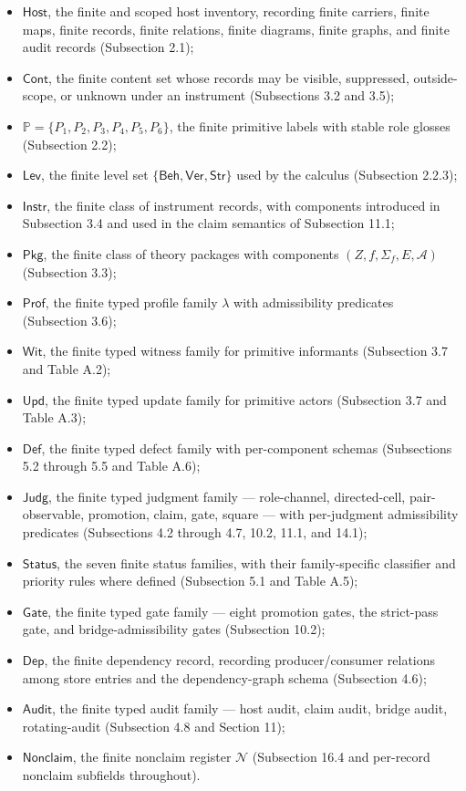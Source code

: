 \documentclass[11pt]{article}
\providecommand{\tightlist}{}
\theoremstyle{definition}
\begin{document}
\begin{itemize}
\tightlist
\item
  \(\mathsf{Host}\), the finite and scoped host inventory, recording finite carriers, finite maps, finite records, finite relations, finite diagrams, finite graphs, and finite audit records (Subsection 2.1);
\item
  \(\mathsf{Cont}\), the finite content set whose records may be visible, suppressed, outside-scope, or unknown under an instrument (Subsections 3.2 and 3.5);
\item
  \(\mathbb P=\{P_{1},P_{2},P_{3},P_{4},P_{5},P_{6}\}\), the finite primitive labels with stable role glosses (Subsection 2.2);
\item
  \(\mathsf{Lev}\), the finite level set \(\{\mathsf{Beh},\mathsf{Ver},\mathsf{Str}\}\) used by the calculus (Subsection 2.2.3);
\item
  \(\mathsf{Instr}\), the finite class of instrument records, with components introduced in Subsection 3.4 and used in the claim semantics of Subsection 11.1;
\item
  \(\mathsf{Pkg}\), the finite class of theory packages with components \((Z,f,\Sigma_{f},E,\mathcal A)\) (Subsection 3.3);
\item
  \(\mathsf{Prof}\), the finite typed profile family \(\lambda\) with admissibility predicates (Subsection 3.6);
\item
  \(\mathsf{Wit}\), the finite typed witness family for primitive informants (Subsection 3.7 and Table A.2);
\item
  \(\mathsf{Upd}\), the finite typed update family for primitive actors (Subsection 3.7 and Table A.3);
\item
  \(\mathsf{Def}\), the finite typed defect family with per-component schemas (Subsections 5.2 through 5.5 and Table A.6);
\item
  \(\mathsf{Judg}\), the finite typed judgment family --- role-channel, directed-cell, pair-observable, promotion, claim, gate, square --- with per-judgment admissibility predicates (Subsections 4.2 through 4.7, 10.2, 11.1, and 14.1);
\item
  \(\mathsf{Status}\), the seven finite status families, with their family-specific classifier and priority rules where defined (Subsection 5.1 and Table A.5);
\item
  \(\mathsf{Gate}\), the finite typed gate family --- eight promotion gates, the strict-pass gate, and bridge-admissibility gates (Subsection 10.2);
\item
  \(\mathsf{Dep}\), the finite dependency record, recording producer/consumer relations among store entries and the dependency-graph schema (Subsection 4.6);
\item
  \(\mathsf{Audit}\), the finite typed audit family --- host audit, claim audit, bridge audit, rotating-audit (Subsection 4.8 and Section 11);
\item
  \(\mathsf{Nonclaim}\), the finite nonclaim register \(\mathcal N\) (Subsection 16.4 and per-record nonclaim subfields throughout).
\end{itemize}
\end{document}
